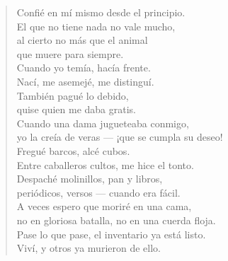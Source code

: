 \documentclass[11pt]{extbook}
\newcommand*{\centeredornament}{\centerline{\pgfornament[width=6cm]{88}}}
\begin{document}
\begin{verse}
  Confié en mí mismo desde el principio. \\
  El que no tiene nada no vale mucho, \\
  al cierto no más que el animal \\
  que muere para siempre. \\
  Cuando yo temía, hacía frente. \\
  Nací, me asemejé, me distinguí. \\
  También pagué lo debido, \\
  quise quien me daba gratis. \\
  Cuando una dama jugueteaba conmigo, \\
  yo la creía de veras --- ¡que se cumpla su deseo!\hspace*{-1mm} \\
  Fregué barcos, alcé cubos. \\
  Entre caballeros cultos, me hice el tonto. \\
  Despaché molinillos, pan y libros, \\
  periódicos, versos --- cuando era fácil. \\
  A veces espero que moriré en una cama, \\
  no en gloriosa batalla, no en una cuerda floja. \\
  Pase lo que pase, el inventario ya está listo. \\
  Viví, y otros ya murieron de ello.
\end{verse}

\newpage

\vspace*{-15mm}
\centeredornament


\end{document}
